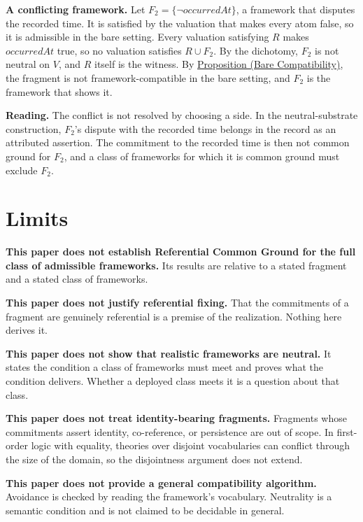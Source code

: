 \documentclass[11pt]{article}
\theoremstyle{plain}
\theoremstyle{definition}
\theoremstyle{remark}
\newcommand{\PropRef}[2]{\hyperref[#1]{Proposition (#2)}}
\newcommand{\Framework}{F}
\newcommand{\pred}[1]{\mathit{#1}}
\begin{document}
\textbf{A conflicting framework.}
Let $\Framework_2 = \{\neg\pred{occurredAt}\}$, a framework that disputes the
recorded time.
It is satisfied by the valuation that makes every atom false, so it is
admissible in the bare setting.
Every valuation satisfying $R$ makes $\pred{occurredAt}$ true, so no valuation
satisfies $R \cup \Framework_2$.
By the dichotomy, $\Framework_2$ is not neutral on $V$, and $R$ itself is the
witness.
By \PropRef{se110.proposition.CompatibleBareIffValid}{Bare Compatibility}, the
fragment is not framework-compatible in the bare setting, and $\Framework_2$
is the framework that shows it.

\textbf{Reading.}
The conflict is not resolved by choosing a side.
In the neutral-substrate construction, $\Framework_2$'s dispute with the
recorded time belongs in the record as an attributed assertion.
The commitment to the recorded time is then not common ground for
$\Framework_2$, and a class of frameworks for which it is common ground must
exclude $\Framework_2$.


\section{Limits}
\label{sec:limits}

\textbf{This paper does not establish Referential Common Ground for the full
  class of admissible frameworks.}
Its results are relative to a stated fragment and a stated class of
frameworks.

\textbf{This paper does not justify referential fixing.}
That the commitments of a fragment are genuinely referential is a premise of the
realization.
Nothing here derives it.

\textbf{This paper does not show that realistic frameworks are neutral.}
It states the condition a class of frameworks must meet and proves what the
condition delivers.
Whether a deployed class meets it is a question about that class.

\textbf{This paper does not treat identity-bearing fragments.}
Fragments whose commitments assert identity, co-reference, or persistence are
out of scope.
In first-order logic with equality, theories over disjoint vocabularies can
conflict through the size of the domain, so the disjointness argument does not
extend.

\textbf{This paper does not provide a general compatibility algorithm.}
Avoidance is checked by reading the framework's vocabulary.
Neutrality is a semantic condition and is not claimed to be decidable in
general.
\end{document}
